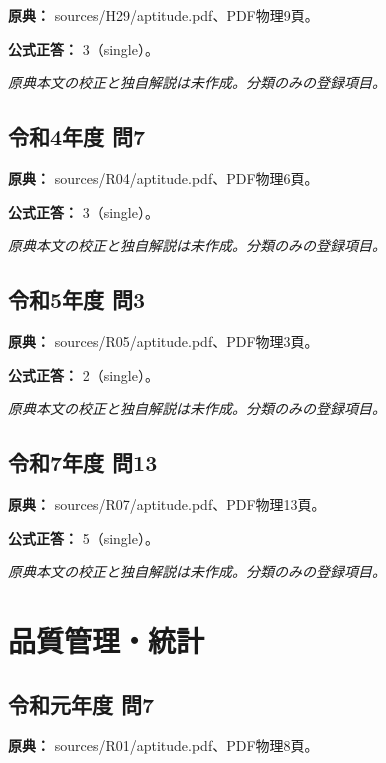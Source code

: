 \noindent\textbf{原典：} sources/H29/aptitude.pdf、PDF物理9頁。

\textbf{公式正答：} 3（single）。

\par\textit{原典本文の校正と独自解説は未作成。分類のみの登録項目。}

\subsection{令和4年度 問7}
\label{q:r04-reg-apt-07}

\noindent\textbf{原典：} sources/R04/aptitude.pdf、PDF物理6頁。

\textbf{公式正答：} 3（single）。

\par\textit{原典本文の校正と独自解説は未作成。分類のみの登録項目。}

\subsection{令和5年度 問3}
\label{q:r05-reg-apt-03}

\noindent\textbf{原典：} sources/R05/aptitude.pdf、PDF物理3頁。

\textbf{公式正答：} 2（single）。

\par\textit{原典本文の校正と独自解説は未作成。分類のみの登録項目。}

\subsection{令和7年度 問13}
\label{q:r07-reg-apt-13}

\noindent\textbf{原典：} sources/R07/aptitude.pdf、PDF物理13頁。

\textbf{公式正答：} 5（single）。

\par\textit{原典本文の校正と独自解説は未作成。分類のみの登録項目。}

\section{品質管理・統計}

\subsection{令和元年度 問7}
\label{q:r01-reg-apt-07}

\noindent\textbf{原典：} sources/R01/aptitude.pdf、PDF物理8頁。

